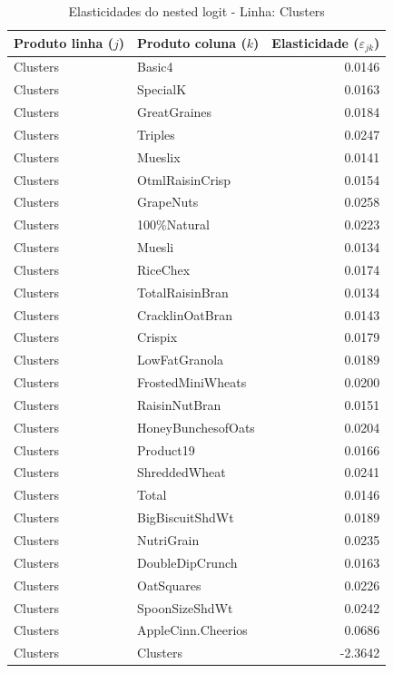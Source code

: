 
\begingroup
\begin{table}[H]
\centering
\caption{Elasticidades do nested logit - Linha: Clusters}
\label{tab:elas-nested-clusters}
\small
\begin{tabular}{llr}
\toprule
Produto linha ($j$) & Produto coluna ($k$) & Elasticidade ($\varepsilon_{jk}$) \\
\midrule
Clusters & Basic4 & 0.0146 \\
Clusters & SpecialK & 0.0163 \\
Clusters & GreatGraines & 0.0184 \\
Clusters & Triples & 0.0247 \\
Clusters & Mueslix & 0.0141 \\
Clusters & OtmlRaisinCrisp & 0.0154 \\
Clusters & GrapeNuts & 0.0258 \\
Clusters & 100\%Natural & 0.0223 \\
Clusters & Muesli & 0.0134 \\
Clusters & RiceChex & 0.0174 \\
Clusters & TotalRaisinBran & 0.0134 \\
Clusters & CracklinOatBran & 0.0143 \\
Clusters & Crispix & 0.0179 \\
Clusters & LowFatGranola & 0.0189 \\
Clusters & FrostedMiniWheats & 0.0200 \\
Clusters & RaisinNutBran & 0.0151 \\
Clusters & HoneyBunchesofOats & 0.0204 \\
Clusters & Product19 & 0.0166 \\
Clusters & ShreddedWheat & 0.0241 \\
Clusters & Total & 0.0146 \\
Clusters & BigBiscuitShdWt & 0.0189 \\
Clusters & NutriGrain & 0.0235 \\
Clusters & DoubleDipCrunch & 0.0163 \\
Clusters & OatSquares & 0.0226 \\
Clusters & SpoonSizeShdWt & 0.0242 \\
Clusters & AppleCinn.Cheerios & 0.0686 \\
Clusters & Clusters & -2.3642 \\

\end{tabular}
\end{table}
